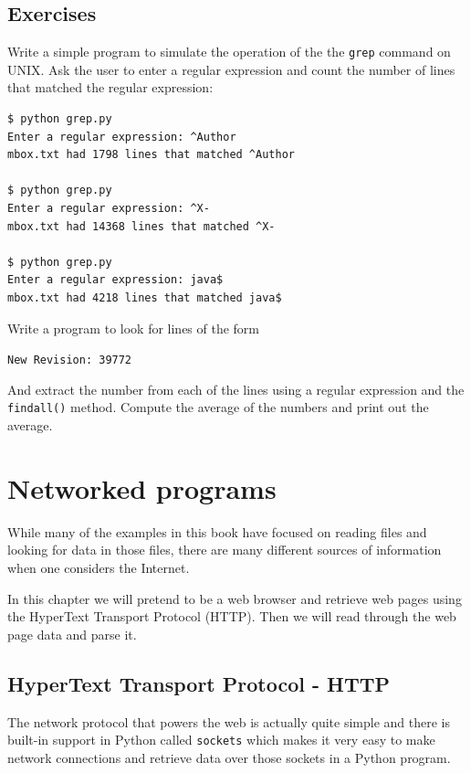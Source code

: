 \documentclass[10pt]{book}
\begin{document}
\section{Exercises}

\begin{ex}
Write a simple program to simulate the operation of the the {\tt grep} command 
on UNIX.  Ask the user to enter a regular expression and count the number
of lines that matched the regular expression:

\beforeverb
\begin{verbatim}
$ python grep.py
Enter a regular expression: ^Author
mbox.txt had 1798 lines that matched ^Author

$ python grep.py
Enter a regular expression: ^X-
mbox.txt had 14368 lines that matched ^X-

$ python grep.py
Enter a regular expression: java$
mbox.txt had 4218 lines that matched java$
\end{verbatim}
\afterverb
%
\end{ex}

\begin{ex}
Write a program to look for lines of the form

\verb"New Revision: 39772"

And extract the number from each of the lines using a regular expression
and the {\tt findall()} method.  Compute the average of the numbers and 
print out the average.
\end{ex}

\chapter{Networked programs}

While many of the examples in this book have focused on reading
files and looking for data in those files, there are many different
sources of information when one considers the Internet.

In this chapter we will pretend to be a web browser and retrieve web
pages using the HyperText Transport Protocol (HTTP).  Then we will read
through the web page data and parse it.

\section{HyperText Transport Protocol - HTTP}

The network protocol that powers the web is actually quite simple and 
there is built-in support in Python called {\tt sockets} which makes it very 
easy to make network connections and retrieve data over those
sockets in a Python program.
\end{document}
